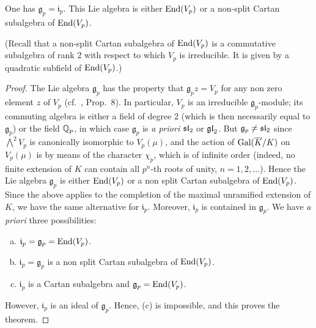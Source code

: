 \begin{subappendices}
\begin{thm}
	One has $\mathfrak{g}_p = \mathfrak{i}_p$. This Lie algebra is either
	$\operatorname{End}(V_p)$ or a non-split Cartan subalgebra of $\operatorname{End}(V_p)$.
\end{thm}

(Recall that a non-split Cartan subalgebra of $\operatorname{End}(V_p)$ is a commutative
subalgebra of rank 2 with respect to which $V_p$ is irreducible. It is given by
a quadratic subfield of $\operatorname{End}(V_p)$.)
\begin{proof}
	The Lie algebra $\mathfrak{g}_p$ has the property that $\mathfrak{g}_p
	z = V_p$ for any non zero element $z$ of $V_p$ (cf.\ \cite[128]{27},
	Prop.~8). In particular, $V_p$ is an irreducible
	$\mathfrak{g}_p$-module; its commuting algebra is either a field of
	degree 2 (which is then necessarily equal to $\mathfrak{g}_p$) or the
	\dpage
	field $\mathbb{Q}_p$, in which case $\mathfrak{g}_p$ is \emph{a priori} $\operatorname{\mathfrak{sl}}_2$
	or $\operatorname{\mathfrak{gl}}_2$. But $\mathfrak{g}_p \ne \operatorname{\mathfrak{sl}}_2$ since $\bigwedge^2 V_p$ is
	canonically isomorphic to $V_p(\mu)$, and the action of $\operatorname{Gal}(\overline{K}/K)$ on $V_p(\mu)$ is by means of the character $\chi_p$, which is of
	infinite order (indeed, no finite extension of $K$ can contain all
	$p^n$-th roots of unity, $n = 1, 2, \dots$). Hence the Lie algebra
	$\mathfrak{g}_p$ is either $\operatorname{End}(V_p)$ or a non split Cartan subalgebra
	of $\operatorname{End}(V_p)$. Since the above applies to the completion of the
	maximal unramified extension of $K$, we have the same alternative for
	$\mathfrak{i}_p$. Moreover, $\mathfrak{i}_p$ is contained in
	$\mathfrak{g}_p$. We have \emph{a priori} three possibilities:
	\begin{enumerate}[(a)]
		\item $\mathfrak{i}_p = \mathfrak{g}_p = \operatorname{End}(V_p)$.
		\item $\mathfrak{i}_p = \mathfrak{g}_p$ is a non split Cartan
			subalgebra of $\operatorname{End}(V_p)$.
		\item $\mathfrak{i}_p$ is a Cartan subalgebra and
			$\mathfrak{g}_p = \operatorname{End}(V_p)$.
	\end{enumerate}
	However, $\mathfrak{i}_p$ is an ideal of $\mathfrak{g}_p$. Hence, (c)
	is impossible, and this proves the theorem.
\end{proof}


\end{subappendices}

